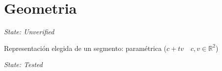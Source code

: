 \section{Geometria}

\textit{State: Unverified}

Representación elegida de un segmento: paramétrica ($c + tv \quad c, v \in \mathds{R}^2$)

\textit{State: Tested}
